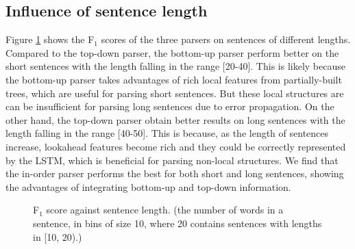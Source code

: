 \documentclass[11pt,letterpaper]{article}
\begin{document}
\subsection{Influence of sentence length}
Figure \ref{length} shows the F$_1$ scores of the three parsers on sentences of different lengths.
Compared to the top-down parser, the bottom-up parser perform better on the short sentences with the length falling in the range [20-40].
This is likely because the bottom-up parser takes advantages of rich local features from partially-built trees, which are useful for parsing short sentences.
But these local structures are can be insufficient for parsing long sentences due to error propagation.
On the other hand, the top-down parser obtain better results on long sentences with the length falling in the range [40-50].
This is because, as the length of sentences increase, lookahead features become rich and they could be correctly represented by the LSTM, which is beneficial for parsing non-local structures.
We find that the in-order parser performs the best for both short and long sentences, showing the advantages of integrating bottom-up and top-down information.
\begin{figure}[!tp]
\caption{F$_1$ score against sentence length. (the number of words in a sentence, in bins of size 10, where 20 contains sentences with lengths in [10, 20).)}
\label{length} 
\end{figure}
\end{document}
